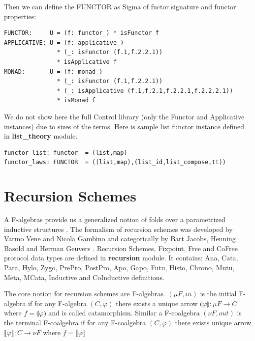 \documentclass{article}
\begin{document}
Then we can define the FUNCTOR as Sigma of fuctor signature and functor properties:

\begin{lstlisting}[mathescape=true]
FUNCTOR:     U = (f: functor_) * isFunctor f
APPLICATIVE: U = (f: applicative_)
               * (_: isFunctor (f.1,f.2.2.1))
               * isApplicative f
MONAD:       U = (f: monad_)
               * (_: isFunctor (f.1,f.2.2.1))
               * (_: isApplicative (f.1,f.2.1,f.2.2.1,f.2.2.2.1))
               * isMonad f
\end{lstlisting}

We do not show here the full Control library (only the Functor and Applicative instances)
due to sizes of the terms. Here is sample list functor instance defined in {\bf list\_theory} module.

\begin{lstlisting}[mathescape=true]
functor_list: functor_ = (list,map)
functor_laws: FUNCTOR  = ((list,map),(list_id,list_compose,tt))
\end{lstlisting}

\newpage
\section{Recursion Schemes}

A F-algebras provide us a generalized notion of folds over a parametrized inductive structures \cite{Pfenning89}.
The formalism of recursion schemes was developed by Varmo Vene and Nicola
Gambino \cite{Gambino04, Vene00} and categorically by Bart Jacobs, Henning Basold
and Herman Geuvers \cite{Jacobs97, Basold16}.
Recursion Schemes, Fixpoint, Free and CoFree protocol data types are defined in {\bf recursion} module.
It contains: Ana, Cata, Para, Hylo, Zygo, PrePro, PostPro, Apo, Gapo, Futu,
Histo, Chrono, Mutu, Meta, MCata, Inductive and CoInductive definitions.

The core notion for recursion schemes are F-algebras. $(\mu F, in)$ is the initial F-algebra if for any F-algebra $(C, \varphi)$
there exists a unique arrow $\llparenthesis \varphi \rrparenthesis : \mu F \rightarrow C$ where $f = \llparenthesis \varphi \rrparenthesis$
and is called catamorphism. Similar a F-coalgebra $(\nu F, out)$ is the terminal
F-coalgebra if for any F-coalgebra $(C, \varphi)$ there exists unique arrow
$\llbracket \varphi \rrbracket : C \rightarrow \nu F$ where $f =
\llbracket \varphi \rrbracket$
\end{document}
